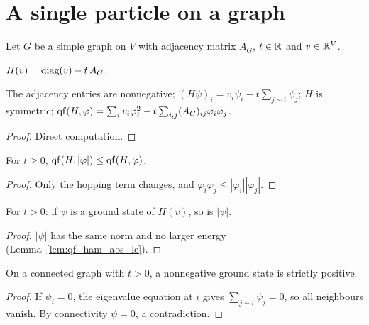 \section{A single particle on a graph}

Let $G$ be a simple graph on $V$ with adjacency matrix $A_G$, $t\in\mathbb{R}$ and $v\in\mathbb{R}^V$.

\begin{definition}
  \label{def:ham}
  \leanok
  $H(v) = \operatorname{diag}(v) - t\,A_G$.
\end{definition}

\begin{lemma}
  \label{lem:ham_basic}
  \leanok
  The adjacency entries are nonnegative; $(H\psi)_i = v_i\psi_i - t\sum_{j\sim i}\psi_j$; $H$ is symmetric;
  $\operatorname{qf}(H,\varphi) = \sum_i v_i\varphi_i^2 - t\sum_{i,j}(A_G)_{ij}\varphi_i\varphi_j$.
\end{lemma}
\begin{proof}
  \leanok
  Direct computation.
\end{proof}

\begin{lemma}
  \label{lem:qf_ham_abs_le}
  \leanok
  For $t\ge 0$, $\operatorname{qf}(H,|\varphi|)\le\operatorname{qf}(H,\varphi)$.
\end{lemma}
\begin{proof}
  \leanok
  Only the hopping term changes, and $\varphi_i\varphi_j\le|\varphi_i||\varphi_j|$.
\end{proof}

\begin{theorem}
  \label{thm:abs_isGroundState}
  \leanok
  For $t>0$: if $\psi$ is a ground state of $H(v)$, so is $|\psi|$.
\end{theorem}
\begin{proof}
  \leanok
  $|\psi|$ has the same norm and no larger energy (Lemma~\ref{lem:qf_ham_abs_le}).
\end{proof}

\begin{theorem}[Positivity]
  \label{thm:pos_of_nonneg}
  \leanok
  On a connected graph with $t>0$, a nonnegative ground state is strictly positive.
\end{theorem}
\begin{proof}
  \leanok
  If $\psi_i=0$, the eigenvalue equation at $i$ gives $\sum_{j\sim i}\psi_j=0$, so all neighbours vanish.
  By connectivity $\psi=0$, a contradiction.
\end{proof}

